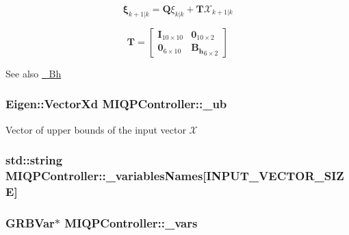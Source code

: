\[ \mathbf{\xi}_{k+1|k} = \mathbf{Q} \xi_{k|k} + \mathbf{T}\mathcal{X}_{k+1|k} \]

\[ \mathbf{T} = \left[\begin{array}{cc} \mathbf{I}_{10\times10} & \mathbf{0}_{10\times2}\\ \mathbf{0}_{6\times10} & \mathbf{B_h}_{6\times2} \end{array}\right] \]

\begin{DoxySeeAlso}{\-See also}
\hyperlink{classMIQPController_a9a989875871a898f0ad19b441a2c67ba}{\-\_\-\-Bh} 
\end{DoxySeeAlso}
\hypertarget{classMIQPController_aa8407451ad8b20c814b12fef631f43f6}{
\subsubsection[{\-\_\-ub}]{\setlength{\rightskip}{0pt plus 5cm}\-Eigen\-::\-Vector\-Xd {\bf \-M\-I\-Q\-P\-Controller\-::\-\_\-ub}}}\label{classMIQPController_aa8407451ad8b20c814b12fef631f43f6}
\-Vector of upper bounds of the input vector $\mathcal{X}$ \hypertarget{classMIQPController_a2c3ddd93fd843a3a4650314b47436be7}{
\subsubsection[{\-\_\-variables\-Names}]{\setlength{\rightskip}{0pt plus 5cm}std\-::string {\bf \-M\-I\-Q\-P\-Controller\-::\-\_\-variables\-Names}\mbox{[}{\bf \-I\-N\-P\-U\-T\-\_\-\-V\-E\-C\-T\-O\-R\-\_\-\-S\-I\-Z\-E}\mbox{]}}}\label{classMIQPController_a2c3ddd93fd843a3a4650314b47436be7}
\hypertarget{classMIQPController_a1143bf95d61a348b08010c909b190029}{
\subsubsection[{\-\_\-vars}]{\setlength{\rightskip}{0pt plus 5cm}\-G\-R\-B\-Var$\ast$ {\bf \-M\-I\-Q\-P\-Controller\-::\-\_\-vars}}}\label{classMIQPController_a1143bf95d61a348b08010c909b190029}
